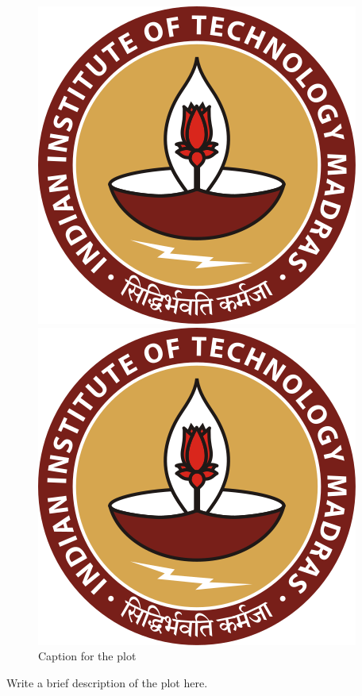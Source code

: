 \documentclass[12pt]{article}
\begin{document}
\begin{figure}[H]
    \centering
    \begin{minipage}{0.45\textwidth}
        \centering
        \includegraphics[width=\textwidth]{logos and images/IIT_Madras_Logo.svg.png}
    \end{minipage}
    \hfill
    \begin{minipage}{0.45\textwidth}
        \centering
        \includegraphics[width=\textwidth]{logos and images/IIT_Madras_Logo.svg.png}
    \end{minipage}
    \caption{Caption for the plot}
\end{figure}
 Write a brief description of the plot here.
\end{document}
